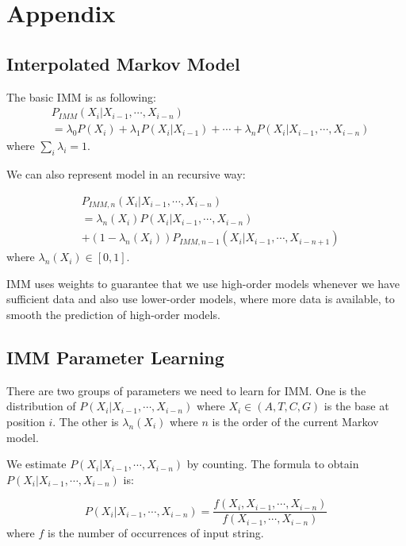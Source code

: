 \documentclass[12pt]{article} %
\begin{document}
\section*{Appendix}
\subsection{Interpolated Markov Model}
The basic IMM is as following:
\begin{equation}
\begin{aligned}
&P_{IMM}(X_i | X_{i-1}, \cdots, X_{i-n})\\
&= \lambda_0P(X_i)+\lambda_1P(X_i | X_{i-1})+\cdots+\lambda_nP(X_i | X_{i-1}, \cdots, X_{i-n})
\end{aligned}
\end{equation}
where $\sum_{i}\lambda_i = 1$.

We can also represent model in an recursive way:

\begin{equation}
\begin{aligned}
&P_{IMM, n}(X_i | X_{i-1}, \cdots, X_{i-n})\\
&= \lambda_n(X_i)P(X_i | X_{i-1}, \cdots, X_{i-n})\\
&+(1-\lambda_n(X_i))P_{IMM, n-1}(X_i | X_{i-1}, \cdots, X_{i-n+1})
\end{aligned}
\end{equation}
where $\lambda_n(X_i) \in [0, 1]$.

IMM uses weights to guarantee that we use high-order models whenever we have sufficient data and also use lower-order models, where more data is available, to smooth the prediction of high-order models. 

\subsection{IMM Parameter Learning}
There are two groups of parameters we need to learn for IMM. One is the distribution of $P(X_i | X_{i-1}, \cdots, X_{i-n})$ where $X_i \in (A, T, C, G)$ is the base at position $i$. The other is $\lambda_n(X_i)$ where $n$ is the order of the current Markov model. 

We estimate $P(X_i | X_{i-1}, \cdots, X_{i-n})$ by counting. The formula to obtain $P(X_i | X_{i-1}, \cdots, X_{i-n})$ is:

\begin{equation}
P(X_i | X_{i-1}, \cdots, X_{i-n}) = \frac{f(X_i, X_{i-1}, \cdots, X_{i-n})}{f(X_{i-1}, \cdots, X_{i-n})}
\end{equation}
where $f$ is the number of occurrences of input string. 
\end{document}
